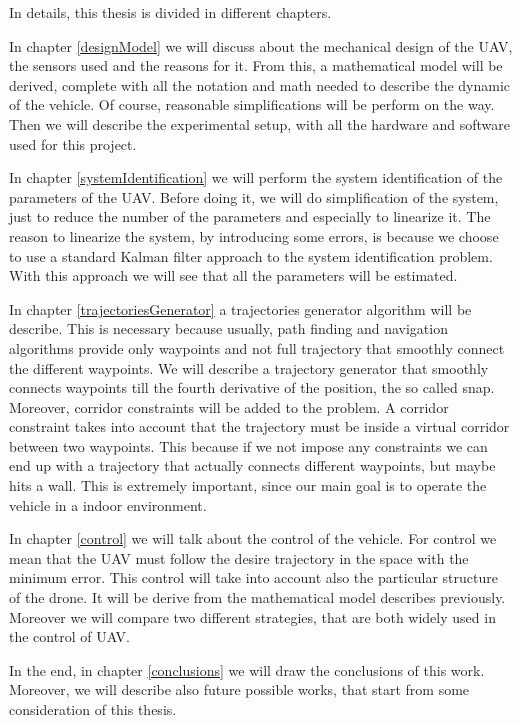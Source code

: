 \noindent In details, this thesis is divided in different chapters.

\noindent In chapter \ref{designModel} we will discuss about the mechanical design of the UAV, the sensors used and the reasons for it. From this, a mathematical model will be derived, complete with all the notation and math needed to describe the dynamic of the vehicle. Of course, reasonable simplifications will be perform on the way. Then we will describe the experimental setup, with all the hardware and software used for this project.

\noindent In chapter \ref{systemIdentification} we will perform the system identification of the parameters of the UAV. Before doing it, we will do simplification of the system, just to reduce the number of the parameters and especially to linearize it. The reason to linearize the system, by introducing some errors, is because we choose to use a standard Kalman filter approach to the system identification problem. With this approach we will see that all the parameters will be estimated.

\noindent In chapter \ref{trajectoriesGenerator} a trajectories generator algorithm will be describe. This is necessary because usually, path finding and navigation algorithms provide only waypoints and not full trajectory that smoothly connect the different waypoints. We will describe a trajectory generator that smoothly connects waypoints till the fourth derivative of the position, the so called snap. Moreover, corridor constraints will be added to the problem. A corridor constraint takes into account that the trajectory must be inside a virtual corridor between two waypoints. This because if we not impose any constraints we can end up with a trajectory that actually connects different waypoints, but maybe hits a wall. This is extremely important, since our main goal is to operate the vehicle in a indoor environment. 

\noindent In chapter \ref{control} we will talk about the control of the vehicle. For control we mean that the UAV must follow the desire trajectory in the space with the minimum error. This control will take into account also the particular structure of the drone. It will be derive from the mathematical model describes previously. Moreover we will compare two different strategies, that are both widely used in the control of UAV.

\noindent In the end, in chapter \ref{conclusions} we will draw the conclusions of this work. Moreover, we will describe also future possible works, that start from some consideration of this thesis. 